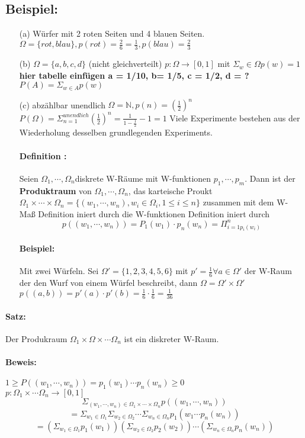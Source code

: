 \documentclass{article}
\begin{document}
\subsection*{Beispiel: } 
\begin{itemize}
    \item [(a)]Würfer mit 2 roten Seiten und 4 blauen Seiten.
    \(\Omega = \{rot, blau\}, p(rot) = \frac{2}{6} = \frac{1}{3}, p(blau) = \frac{2}{3}\) 
    \item[(b)] \(\Omega = \{a, b, c, d\}\) (nicht gleichverteilt) \(p : \Omega \to [0,1]\) mit \(\Sigma_ w\in \Omega p(w) = 1\) \textbf{hier tabelle einfügen a = 1/10, b= 1/5, c = 1/2, d = ?} \(P(A) = \Sigma_{w\in A} p(w)\)
    \item[(c)] abzählbar unendlich \(\Omega =\mathbb{N}, p(n) = (\frac{1}{2})^n\) \(P(\Omega) = \Sigma^{unendlich}_{n = 1} (\frac{1}{2})^n = \frac{1}{1-\frac{1}{2}} - 1 = 1\) Viele Experimente bestehen aus der Wiederholung desselben grundlegenden Experiments. \paragraph*{Definition :} Seien \(\Omega_1, \cdots, \Omega_n\)diskrete W-Räume mit W-funktionen \(p_1, \cdots, p_m\). Dann ist der \textbf{Produktraum} von \(\Omega_1, \cdots, \Omega_n\), das karteische Proukt \(\Omega_1 \times \cdots \times \Omega_n = \{(w_1, \cdots, w_n), w_i\in \Omega_i, 1 \leq i \leq n\}\) zusammen mit dem W-Maß Definition iniert durch die W-funktionen Definition iniert durch 
    \[ 
        p((w_1, \cdots, w_n)) = P_1(w_1) \cdot p_n(w_n) = \Pi^n_{i = 1 p_i(w_i)}
    \]
    \paragraph*{Beispiel:} Mit zwei Würfeln. Sei \(\Omega' = \{1, 2, 3, 4, 5, 6\}\) mit \(p' = \frac{1}{6} \forall a \in \Omega'\) der W-Raum der den Wurf von einem Würfel beschreibt, dann \(\Omega = \Omega' \times \Omega'\) \\ \(p((a,b)) = p'(a) \cdot p'(b) = \frac{1}{6} \cdot \frac{1}{6} = \frac{1}{36}\)
\end{itemize}
\paragraph*{Satz:} Der Produkraum \(\Omega_1 \times \Omega \times \cdots \Omega_n\) ist ein diskreter W-Raum.

\paragraph*{Beweis:} \(1 \geq P((w_1, \cdots, w_n)) = p_1(w_1)\cdots p_n(w_n) \geq 0\) \\
\(p: \Omega_1 \times \cdots \Omega_n \to [0, 1]\) \\
\[
    \Sigma_{(w_1, \cdots, w_n) \in \Omega_1 \times \cdots \times \Omega_n} p((w_1, \cdots, w_n)) 
\]
\[  = \Sigma_{w_1 \in \Omega_1} \Sigma_{w_2 \in \Omega_2} \cdots      \Sigma_{w_n \in \Omega_n} p_1(w_1 \cdots p_n(w_n)) 
\]
\[ = (\Sigma_{w_1 \in \Omega_1} p_1(w_1))(\Sigma_{w_2 \in \Omega_2} p_2(w_2)) \cdots (\Sigma_{w_n \in \Omega_n} p_n(w_n))
\]
\end{document}
